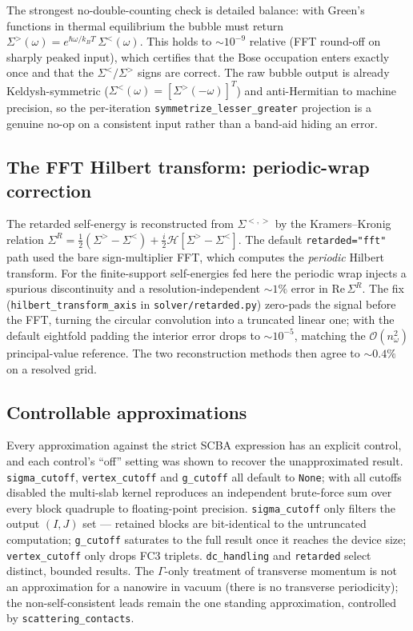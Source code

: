 The strongest no-double-counting check is detailed balance: with
Green's functions in thermal equilibrium the bubble must return
$\Sigma^{>}(\omega)=e^{\hbar\omega/k_BT}\,\Sigma^{<}(\omega)$. This
holds to $\sim10^{-9}$ relative (FFT round-off on sharply peaked
input), which certifies that the Bose occupation enters exactly once
and that the $\Sigma^{<}/\Sigma^{>}$ signs are correct. The raw
bubble output is already Keldysh-symmetric
($\Sigma^{<}(\omega)=[\Sigma^{>}(-\omega)]^{T}$) and anti-Hermitian to
machine precision, so the per-iteration
\texttt{symmetrize\_lesser\_greater} projection is a genuine no-op on
a consistent input rather than a band-aid hiding an error.

\subsection{The FFT Hilbert transform: periodic-wrap correction}

The retarded self-energy is reconstructed from $\Sigma^{<,>}$ by the
Kramers--Kronig relation
$\Sigma^{R}=\tfrac12(\Sigma^{>}-\Sigma^{<})
+\tfrac{i}{2}\mathcal{H}[\Sigma^{>}-\Sigma^{<}]$. The
default \texttt{retarded="fft"} path used the bare sign-multiplier
FFT, which computes the \emph{periodic} Hilbert transform. For the
finite-support self-energies fed here the periodic wrap injects a
spurious discontinuity and a resolution-independent ${\sim}1\%$ error
in $\mathrm{Re}\,\Sigma^{R}$. The fix
(\texttt{hilbert\_transform\_axis} in \texttt{solver/retarded.py})
zero-pads the signal before the FFT, turning the circular convolution
into a truncated linear one; with the default eightfold padding the
interior error drops to ${\sim}10^{-5}$, matching the
$\mathcal{O}(n_\omega^2)$ principal-value reference. The two
reconstruction methods then agree to $\sim0.4\%$ on a resolved grid.

\subsection{Controllable approximations}

Every approximation against the strict SCBA expression has an explicit
control, and each control's ``off'' setting was shown to recover the
unapproximated result. \texttt{sigma\_cutoff}, \texttt{vertex\_cutoff}
and \texttt{g\_cutoff} all default to \texttt{None}; with all cutoffs
disabled the multi-slab kernel reproduces an independent brute-force
sum over every block quadruple to floating-point precision.
\texttt{sigma\_cutoff} only filters the output $(I,J)$ set --- retained
blocks are bit-identical to the untruncated computation;
\texttt{g\_cutoff} saturates to the full result once it reaches the
device size; \texttt{vertex\_cutoff} only drops FC3 triplets.
\texttt{dc\_handling} and \texttt{retarded} select distinct, bounded
results. The $\Gamma$-only treatment of transverse momentum is not an
approximation for a nanowire in vacuum (there is no transverse
periodicity); the non-self-consistent leads remain the one standing
approximation, controlled by \texttt{scattering\_contacts}.

